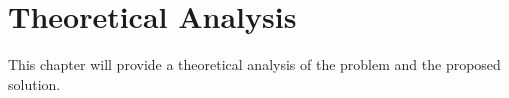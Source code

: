 \chapter{Theoretical Analysis}\label{theoretical-analysis}
This chapter will provide a theoretical analysis of the problem and the proposed solution.